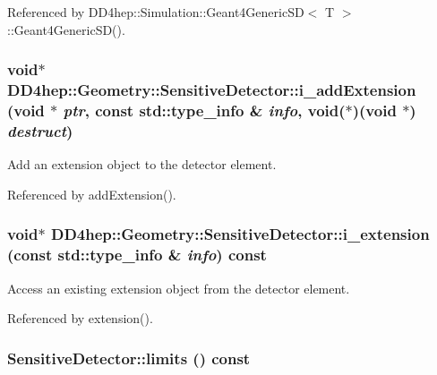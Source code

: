 Referenced by DD4hep::Simulation::Geant4GenericSD$<$ T $>$::Geant4GenericSD().\hypertarget{class_d_d4hep_1_1_geometry_1_1_sensitive_detector_a0b0b5adaec49d7ff0ed3b9e39d54cb4f}{
\subsubsection[{i\_\-addExtension}]{\setlength{\rightskip}{0pt plus 5cm}void$\ast$ DD4hep::Geometry::SensitiveDetector::i\_\-addExtension (void $\ast$ {\em ptr}, \/  const std::type\_\-info \& {\em info}, \/  void($\ast$)(void $\ast$) {\em destruct})}}
\label{class_d_d4hep_1_1_geometry_1_1_sensitive_detector_a0b0b5adaec49d7ff0ed3b9e39d54cb4f}


Add an extension object to the detector element. 

Referenced by addExtension().\hypertarget{class_d_d4hep_1_1_geometry_1_1_sensitive_detector_a194eef5ee2865d3fe6b452fe057a617b}{
\subsubsection[{i\_\-extension}]{\setlength{\rightskip}{0pt plus 5cm}void$\ast$ DD4hep::Geometry::SensitiveDetector::i\_\-extension (const std::type\_\-info \& {\em info}) const}}
\label{class_d_d4hep_1_1_geometry_1_1_sensitive_detector_a194eef5ee2865d3fe6b452fe057a617b}


Access an existing extension object from the detector element. 

Referenced by extension().\hypertarget{class_d_d4hep_1_1_geometry_1_1_sensitive_detector_a668c56c4c046721d0732de64df8cea14}{
\subsubsection[{limits}]{ SensitiveDetector::limits () const}}
\label{class_d_d4hep_1_1_geometry_1_1_sensitive_detector_a668c56c4c046721d0732de64df8cea14}


